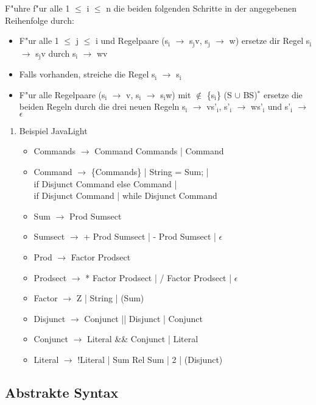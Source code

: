 \documentclass[11pt]{article}
\begin{document}
F"uhre f"ur alle 1 $\le$ i $\le$ n die beiden folgenden Schritte in der angegebenen Reihenfolge durch:

\begin{itemize}
\item F"ur alle 1 $\le$ j $\le$ i und Regelpaare (s$_{\text{i}}$ $\to$ s$_{\text{j}}$v, s$_{\text{j}}$ $\to$ w) ersetze dir Regel s$_{\text{i}}$ $\to$ s$_{\text{j}}$v durch s$_{\text{i}}$ $\to$ wv
\item Falls vorhanden, streiche die Regel s$_{\text{i}}$ $\to$ s$_{\text{i}}$
\item F"ur alle Regelpaare (s$_{\text{i}}$ $\to$ v, s$_{\text{i}}$ $\to$ s$_{\text{i}}$w) mit $\notin$ \{s$_{\text{i}}$\} \texttimes{} (S $\cup$ BS)$^{\text{*}}$ ersetze die beiden Regeln durch die drei neuen Regeln s$_{\text{i}}$ $\to$ vs'$_{\text{i}}$, s'$_{\text{i}}$ $\to$ ws'$_{\text{i}}$ und s'$_{\text{i}}$ $\to$ $\epsilon$
\end{itemize}


\begin{enumerate}
\item Beispiel JavaLight
\label{sec-4-4-4-1}

\begin{itemize}
\item Commands $\to$ Command Commands | Command
\item Command $\to$ \{Commands\} | String = Sum; | \\ if Disjunct Command else Command | \\ if Disjunct Command | while Disjunct Command
\item Sum $\to$ Prod Sumsect
\item Sumsect $\to$ + Prod Sumsect | - Prod Sumsect | $\epsilon$
\item Prod $\to$ Factor Prodsect
\item Prodsect $\to$ * Factor Prodsect | / Factor Prodsect | $\epsilon$
\item Factor $\to$ Z | String | (Sum)
\item Disjunct $\to$ Conjunct || Disjunct | Conjunct
\item Conjunct $\to$ Literal \&\& Conjunct | Literal
\item Literal $\to$ !Literal | Sum Rel Sum | 2 | (Disjunct)
\end{itemize}
\end{enumerate}



\subsection{Abstrakte Syntax}
\label{sec-4-5}
\end{document}
